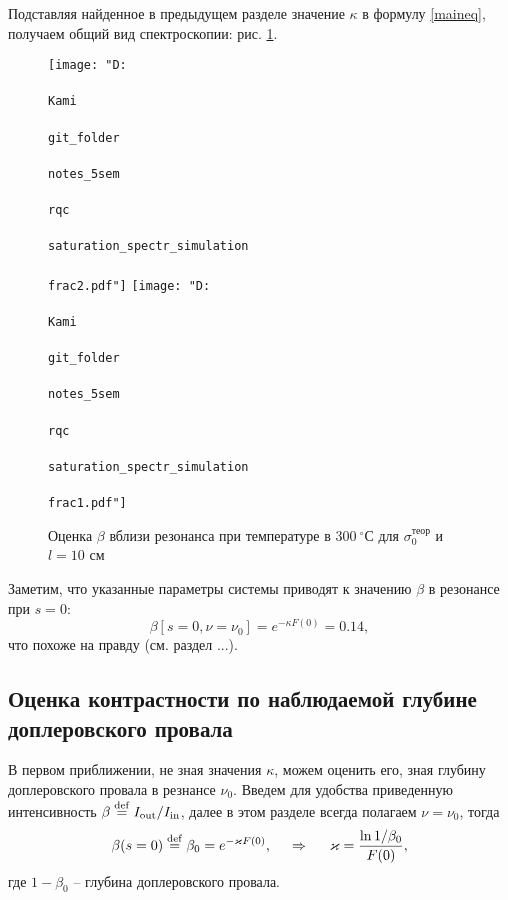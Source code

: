 Подставляя найденное в предыдущем разделе значение $\kappa$ в формулу \eqref{maineq}, получаем общий вид спектроскопии: рис. \ref{fig:frac12}.

\begin{figure}[h]
    \centering
    \texttt{[image: "D:\\\\Kami\\\\git\_folder\\\\notes\_5sem\\\\rqc\\\\saturation\_spectr\_simulation\\\\frac2.pdf"]}
    \hspace{5 mm} 
    \texttt{[image: "D:\\\\Kami\\\\git\_folder\\\\notes\_5sem\\\\rqc\\\\saturation\_spectr\_simulation\\\\frac1.pdf"]}
    \caption{Оценка $\beta$ вблизи резонанса при температуре в $300\ {}^{\circ}$С для $\sigma_0^{\text{теор}}$ и $l = 10$ см}
    \label{fig:frac12}
\end{figure}


Заметим, что указанные параметры системы приводят к значению $\beta$ в резонансе при $s=0$:
\begin{equation*}
    \beta[s=0, \nu=\nu_0] = e^{- \kappa F(0)} = 0.14,
\end{equation*}
что похоже на правду (см. раздел ...).





\newpage

\subsection{Оценка контрастности по наблюдаемой глубине доплеровского провала}

В первом приближении, не зная значения $\kappa$, можем оценить его, зная глубину доплеровского провала в резнансе $\nu_0$. Введем для удобства приведенную интенсивность $\beta \overset{\mathrm{def}}{=}  \sub{I}{out}/\sub{I}{in}$, далее в этом разделе всегда полагаем $\nu = \nu_0$, тогда
\begin{equation*}
    \beta(s=0) \overset{\mathrm{def}}{=}  \beta_0 = e^{- \kappa F(0)},
    \hspace{0.5cm} \Rightarrow \hspace{0.5cm}
    \kappa = \frac{\ln 1/\beta_0}{F(0)},
\end{equation*}
где $1-\beta_0$ -- глубина доплеровского провала.

